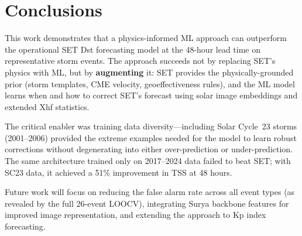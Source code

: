 \documentclass[11pt,a4paper]{article}
\begin{document}
\section{Conclusions}

This work demonstrates that a physics-informed ML approach can outperform the operational SET Dst forecasting model at the 48-hour lead time on representative storm events. The approach succeeds not by replacing SET's physics with ML, but by \textbf{augmenting} it: SET provides the physically-grounded prior (storm templates, CME velocity, geoeffectiveness rules), and the ML model learns when and how to correct SET's forecast using solar image embeddings and extended Xhf statistics.

The critical enabler was training data diversity---including Solar Cycle~23 storms (2001--2006) provided the extreme examples needed for the model to learn robust corrections without degenerating into either over-prediction or under-prediction. The same architecture trained only on 2017--2024 data failed to beat SET; with SC23 data, it achieved a 51\% improvement in TSS at 48 hours.

Future work will focus on reducing the false alarm rate across all event types (as revealed by the full 26-event LOOCV), integrating Surya backbone features for improved image representation, and extending the approach to Kp index forecasting.
\end{document}
